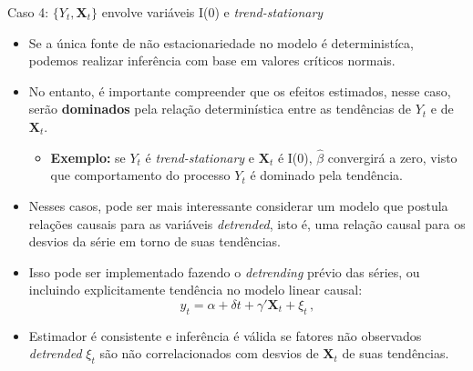 \documentclass[11pt]{beamer}
\begin{document}
			\begin{frame}{Caso 4: $\{Y_t,\boldsymbol{X}_t\}$ envolve variáveis I(0) e \textit{trend-stationary}}
				\begin{itemize}
					\item Se a única fonte de não estacionariedade no modelo é deterministíca, podemos realizar inferência com base em valores críticos normais.
					\item No entanto, é importante compreender que os efeitos estimados, nesse caso, serão \textbf{dominados} pela relação determinística entre as tendências de $Y_t$ e de $\boldsymbol{X}_t$.
					\begin{itemize}
						\item \textbf{Exemplo:} se $Y_t$ é \textit{trend-stationary} e $\boldsymbol{X}_t$ é I(0), $\hat \beta$ convergirá a  zero, visto que comportamento do processo $Y_t$ é {\color{blue}dominado} pela tendência.
					\end{itemize}
					\item Nesses casos, pode ser mais interessante considerar um modelo que postula relações causais para as variáveis \textit{detrended}, isto é, uma relação causal para os desvios da série em torno de suas tendências.
					\item Isso pode ser implementado fazendo o \textit{detrending} prévio das séries, ou incluindo explicitamente tendência no modelo linear causal:
					\begin{equation*}
						y_t = \alpha + \delta t + \gamma'\boldsymbol{X}_t+\xi_t \, ,
					\end{equation*}
					\item Estimador é consistente e inferência é válida se fatores não observados \textit{detrended} $\xi_t$ são não correlacionados com desvios de $\boldsymbol{X}_t$ de suas tendências.  
				\end{itemize}
			\end{frame}
			
\end{document}
